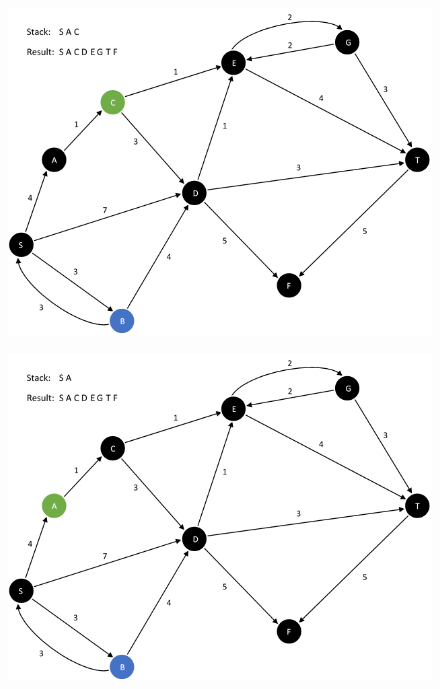 \documentclass{article}
\begin{document}
\begin{enumerate}[leftmargin=\labelsep]
\begin{figure}[H]
\centering
\includegraphics[scale=0.6]{images/Q5/a/13.png}
\end{figure}

\begin{figure}[H]
\centering
\includegraphics[scale=0.6]{images/Q5/a/14.png}
\end{figure}


\end{enumerate}
\end{document}
